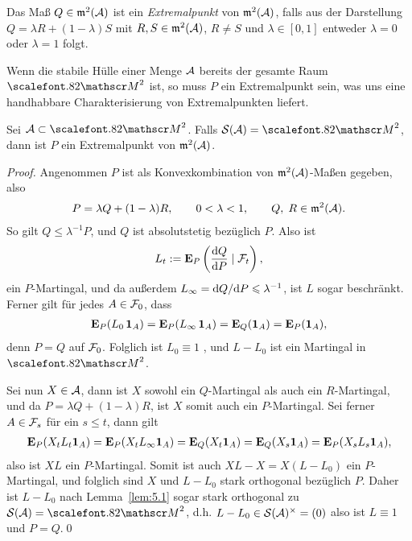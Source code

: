 \begin{definition}
Das Maß $Q\in \m^2(\AA)$ ist ein \emph{Extremalpunkt} von $\m^2(\AA)$, falls
aus der Darstellung $Q= \lambda R + (1-\lambda) S$ mit $R,S\in \m^2(\AA)$,
$R\neq S$ und $\lambda\in [0,1]$ entweder $\lambda=0$ oder $\lambda=1$
folgt.\fish
\end{definition}

Wenn die stabile Hülle einer Menge $\AA$ bereits der gesamte Raum
$\MM^2$ ist, so muss $P$ ein Extremalpunkt sein, was uns eine handhabbare
Charakterisierung von Extremalpunkten liefert.

\begin{theorem}
\label{prop:5.4}
Sei $\AA\subset\MM^2$. Falls $\SS(\AA) = \MM^2$, dann ist $P$ ein
Extremalpunkt von $\m^2(\AA)$.\fish
\end{theorem}
\begin{proof}
Angenommen $P$ ist als Konvexkombination von $\m^2(\AA)$-Maßen gegeben, also 
\begin{align*}
P = \lambda Q + (1-\lambda)R,\qquad 0 < \lambda < 1,\qquad Q,\; R\in\m^2(\AA).
\end{align*}
So gilt $Q \le \lambda^{-1} P$, und $Q$ ist absolutstetig bezüglich $P$. Also
ist
\begin{align*}
L_t \defl \E_P\left(\frac{\dQ}{\dP}\mid \FF_t \right),
\end{align*}
ein $P$-Martingal, und da außerdem $L_\infty = \dQ/\dP \le \lambda^{-1}$, ist
$L$ sogar beschränkt. Ferner gilt für jedes $A\in\FF_0$, dass
\begin{align*}
\E_P (L_0\,\Id_A) = \E_P (L_\infty\,\Id_A) = \E_Q (\Id_A) = \E_P(\Id_A),
\end{align*}
denn $P=Q$ auf $\FF_0$. Folglich ist $L_0\equiv 1$ \fs, und $L-L_0$ ist ein
Martingal in $\MM^2$.

Sei nun $X\in\AA$, dann ist $X$ sowohl ein $Q$-Martingal als auch ein
$R$-Martingal, und da $P = \lambda Q+ (1-\lambda)R$, ist $X$ somit auch ein
$P$-Martingal. Sei ferner $A\in\FF_s$ für ein $s\le t$, dann gilt
\begin{align*}
\E_P(X_tL_t\Id_A) = \E_P(X_tL_\infty\Id_A) = \E_Q(X_t\Id_A) = \E_Q(X_s\Id_A) = 
\E_P(X_sL_s\Id_A),
\end{align*}
also ist $XL$ ein $P$-Martingal. Somit ist auch $XL - X = X(L-L_0)$ ein
$P$-Martingal, und folglich sind $X$ und $L-L_0$ stark orthogonal bezüglich $P$.
Daher ist $L-L_0$ nach Lemma~\ref{lem:5.1} sogar stark orthogonal zu
$\SS(\AA) = \MM^2$, d.h. $L-L_0 \in\SS(\AA)^\times = (0)$ also ist $L\equiv 1$
und $P=Q$.\qed
\end{proof}

